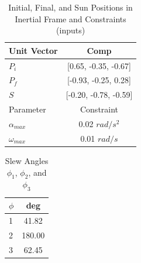 \documentclass[letterpaper, preprint, paper,11pt]{AAS}	%
\begin{document}
	\begin{multicols}{2}
		\begin{center}
			\begin{table}[H]
				\centering
				\caption{Initial, Final, and Sun Positions in Inertial Frame and Constraints (inputs)}
				\begin{tabular}{lc}
					\toprule
					\midrule
					Unit Vector & Comp \\
					\midrule
					$P_i$ & [0.65, -0.35, -0.67] \\
					$P_f$ & [-0.93, -0.25, 0.28] \\ 
					$S$ & [-0.20, -0.78, -0.59] \\
					\midrule
					\midrule
					Parameter & Constraint \\ 
					\midrule
					$\alpha_{max}$ & 0.02 $rad/s^2$ \\
					$\omega_{max}$ & 0.01 $rad/s$ \\ 
					\midrule
					\bottomrule
				\end{tabular}%
				\label{tab:alpha0_PiPfS_AWmax}%
			\end{table}
		\end{center}
	\columnbreak
		\begin{center}
			\begin{table}[H]
				\centering
				\caption{Slew Angles $\phi_1$, $\phi_2$, and $\phi_3$}
				\begin{tabular}{lc}
					\toprule
					\midrule
					$\phi$ & deg \\
					\midrule
					1 & 41.82 \\
					2 & 180.00 \\ 
					3 & 62.45 \\
					\midrule
					\bottomrule
				\end{tabular}%
				\label{tab:alpha0_phi_123}%
			\end{table}%
		\end{center}
	\end{multicols}
			
\end{document}
